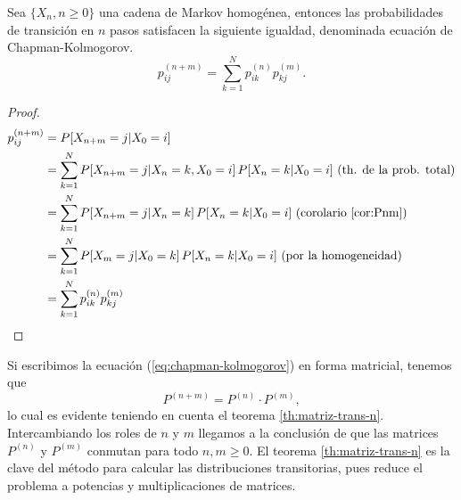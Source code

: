 \begin{teorema}
    Sea $\{X_n,n\geq 0\}$ una cadena de Markov homogénea, entonces las probabilidades de transición en $n$ pasos satisfacen la siguiente igualdad, denominada ecuación de Chapman-Kolmogorov.
    \begin{equation}
        \label{eq:chapman-kolmogorov}
        p_{ij}^{(n+m)}=\sum_{k=1}^N p_{ik}^{(n)}p_{kj}^{(m)}.
    \end{equation} 
\end{teorema}
\begin{proof}
    \begin{equation*}
        \begin{split}
            p_{ij}^{(n+m)} &= P[X_{n+m}=j|X_0=i] \\
            &= \sum_{k=1}^N P[X_{n+m}=j|X_n=k,X_0=i]\,P[X_n=k|X_0=i]\text{ (th. de la prob. total)}\\
            &= \sum_{k=1}^N P[X_{n+m}=j|X_n=k]\,P[X_n=k|X_0=i]\text{ (corolario \ref{cor:Pnm})}\\
            &= \sum_{k=1}^N P[X_{m}=j|X_0=k]\,P[X_n=k|X_0=i]\text{ (por la homogeneidad)}\\
            &= \sum_{k=1}^N p_{ik}^{(n)} p_{kj}^{(m)}
        \end{split}
    \end{equation*}
\end{proof}

Si escribimos la ecuación (\ref{eq:chapman-kolmogorov}) en forma matricial, tenemos que
$$
P^{(n+m)}=P^{(n)}\cdot P^{(m)},
$$
lo cual es evidente teniendo en cuenta el teorema \ref{th:matriz-trans-n}. Intercambiando los roles de $n$ y $m$ llegamos a la conclusión de que las matrices $P^{(n)}$ y $P^{(m)}$ conmutan para todo $n,m\geq 0$. El teorema \ref{th:matriz-trans-n} es la clave del método para calcular las distribuciones transitorias, pues reduce el problema a potencias y multiplicaciones de matrices.

